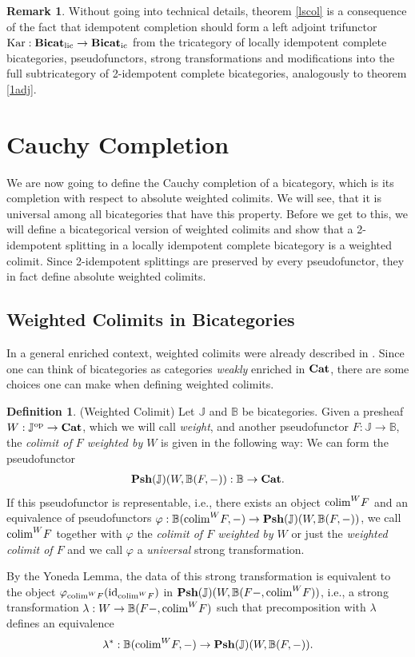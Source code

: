 \documentclass[12pt,oneside,reqno,a4paper]{article}
\theoremstyle{definition}
\newtheorem{definition}[theorem]{Definition}
\newtheorem{remark}[theorem]{Remark}
\newcommand{\op}{^\textup{op}}
\newcommand{\Cat}{\textbf{\textup{Cat}}}
\newcommand{\Bicatlic}{{\textbf{\textup{Bicat}}_\textup{lic}}}
\newcommand{\Bicatic}{{\textbf{\textup{Bicat}}_\textup{ic}}}
\newcommand{\Psh}[1]{\textbf{\textup{Psh}}(#1)}
\newcommand{\Kartwo}{\textup{Kar}}
\renewcommand{\phi}{\varphi}
\newcommand{\id}{\textup{id}}
\newcommand{\bB}{\mathbb{B}}
\newcommand{\bJ}{\mathbb{J}}
\newcommand{\colim}{\textup{colim}}
\begin{document}
\begin{remark}
Without going into technical details, theorem \ref{lscol} is a consequence of the fact that idempotent completion should form a left adjoint trifunctor $\Kartwo:\Bicatlic\to\Bicatic$ from the tricategory of locally idempotent complete bicategories, pseudofunctors, strong transformations and modifications into the full subtricategory of 2-idempotent complete bicategories, analogously to theorem \ref{1adj}.
\end{remark}

\section{Cauchy Completion} \label{sec5}

We are now going to define the Cauchy completion of a bicategory, which is its completion with respect to absolute weighted colimits. We will see, that it is universal among all bicategories that have this property. Before we get to this, we will define a bicategorical version of weighted colimits and show that a 2-idempotent splitting in a locally idempotent complete bicategory is a weighted colimit. Since 2-idempotent splittings are preserved by every pseudofunctor, they in fact define absolute weighted colimits.

\subsection{Weighted Colimits in Bicategories}

In a general enriched context, weighted colimits were already described in \cite{Kel2}. Since one can think of bicategories as categories \textit{weakly} enriched in $\Cat$, there are some choices one can make when defining weighted colimits.

\begin{definition}{(Weighted Colimit)}
Let $\bJ$ and $\bB$ be bicategories. Given a presheaf $W:\bJ\op\to\Cat$, which we will call \textit{weight}, and another pseudofunctor $F:\bJ\to\bB$, the \textit{colimit of $F$ weighted by $W$} is given in the following way: We can form the pseudofunctor
\begin{align*}
\Psh{\bJ}(W,\bB(F,-)):\bB\to\Cat.
\end{align*}
If this pseudofunctor is representable, i.e., there exists an object $\colim^W F$ and an equivalence of pseudofunctors $\phi:\bB(\colim^W F,-)\to\Psh{\bJ}(W,\bB(F,-))$, we call $\colim^W F$ together with $\phi$ the \textit{colimit of $F$ weighted by $W$} or just the \textit{weighted colimit of $F$} and we call $\phi$ a \textit{universal} strong transformation.

By the Yoneda Lemma, the data of this strong transformation is equivalent to the object $\phi_{\colim^W F}(\id_{\colim^W F})$ in $\Psh{\bJ}(W,\bB(F-,\colim^W F))$, i.e., a strong transformation $\lambda:W\to \bB(F-,\colim^W F)$ such that precomposition with $\lambda$ defines an equivalence
\begin{align*}
\lambda^*:\bB(\colim^W F,-)\to\Psh{\bJ}(W,\bB(F,-)).
\end{align*}
\end{definition}
\end{document}
